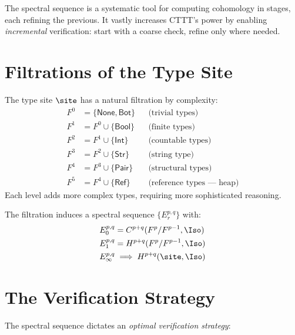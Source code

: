 The spectral sequence is a systematic tool for computing cohomology
in stages, each refining the previous.  It vastly increases CTTT's
power by enabling \emph{incremental} verification: start with a
coarse check, refine only where needed.

\section{Filtrations of the Type Site}

\begin{definition}
The type site $\site$ has a natural filtration by complexity:
\begin{align}
  F^0 &= \{\mathsf{None}, \mathsf{Bot}\}
    && \text{(trivial types)} \\
  F^1 &= F^0 \cup \{\mathsf{Bool}\}
    && \text{(finite types)} \\
  F^2 &= F^1 \cup \{\mathsf{Int}\}
    && \text{(countable types)} \\
  F^3 &= F^2 \cup \{\mathsf{Str}\}
    && \text{(string type)} \\
  F^4 &= F^3 \cup \{\mathsf{Pair}\}
    && \text{(structural types)} \\
  F^5 &= F^4 \cup \{\mathsf{Ref}\}
    && \text{(reference types --- heap)}
\end{align}
Each level adds more complex types, requiring more sophisticated
reasoning.
\end{definition}

\begin{definition}
The filtration induces a spectral sequence $\{E_r^{p,q}\}$ with:
\begin{align}
  E_0^{p,q} &= C^{p+q}(F^p / F^{p-1}, \Iso) \\
  E_1^{p,q} &= H^{p+q}(F^p / F^{p-1}, \Iso) \\
  E_\infty^{p,q} &\implies H^{p+q}(\site, \Iso)
\end{align}
\end{definition}

\section{The Verification Strategy}

The spectral sequence dictates an \emph{optimal verification strategy}:

